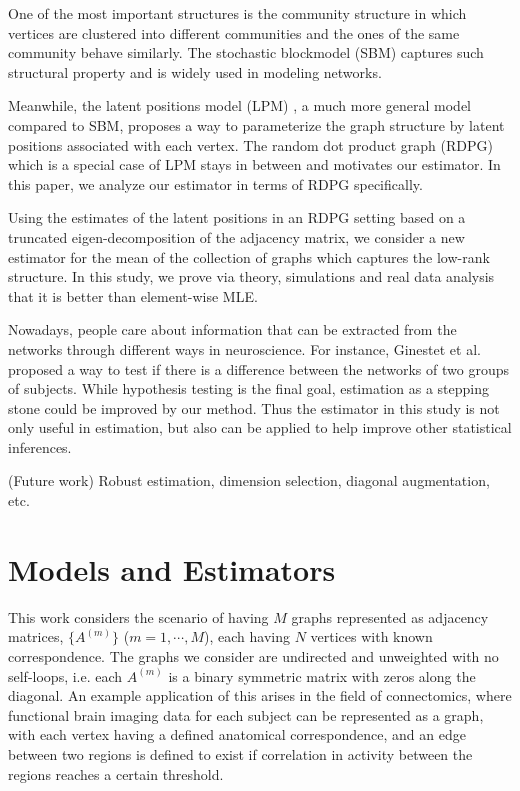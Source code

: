 \documentclass[a4paper]{article}
\begin{document}
One of the most important structures is the community structure in which vertices are clustered into different communities and the ones of the same community behave similarly. The stochastic blockmodel (SBM) \cite{holland1983stochastic} captures such structural property and is widely used in modeling networks.

Meanwhile, the latent positions model (LPM) \cite{hoff2002latent}, a much more general model compared to SBM, proposes a way to parameterize the graph structure by latent positions associated with each vertex. The random dot product graph (RDPG) \cite{young2007random, nickel2007random} which is a special case of LPM stays in between and motivates our estimator. In this paper, we analyze our estimator in terms of RDPG specifically.

Using the estimates of the latent positions in an RDPG setting based on a truncated eigen-decomposition of the adjacency matrix, we consider a new estimator for the mean of the collection of graphs which captures the low-rank structure. In this study, we prove via theory, simulations and real data analysis that it is better than element-wise MLE.

Nowadays, people care about information that can be extracted from the networks through different ways in neuroscience.
For instance, Ginestet et al. \cite{ginestet2014hypothesis} proposed a way to test if there is a difference between the networks of two groups of subjects. While hypothesis testing is the final goal, estimation as a stepping stone could be improved by our method. Thus the estimator in this study is not only useful in estimation, but also can be applied to help improve other statistical inferences.

(Future work) Robust estimation, dimension selection, diagonal augmentation, etc.



\section{Models and Estimators}
\label{section:model_estimator}
This work considers the scenario of having $M$ graphs represented as adjacency matrices, $\{A^{(m)}\}$ ($m = 1, \cdots, M$), each having $N$ vertices with known correspondence. The graphs we consider are undirected and unweighted with no self-loops, i.e. each $A^{(m)}$ is a binary symmetric matrix with zeros along the diagonal. An example application of this arises in the field of connectomics, where functional brain imaging data for each subject can be represented as a graph, with each vertex having a defined anatomical correspondence, and an edge between two regions is defined to exist if correlation in activity between the regions reaches a certain threshold.
\end{document}

